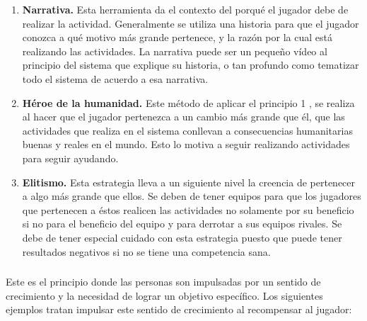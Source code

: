     \begin{enumerate}
    
        \item {\bf Narrativa.} Esta herramienta da el contexto del porqué el jugador debe de realizar la actividad. Generalmente se utiliza una historia para que el jugador conozca a qué motivo más grande pertenece, y la razón por la cual está realizando las actividades. La narrativa puede ser un pequeño vídeo al principio del sistema que explique su historia, o tan profundo como tematizar todo el sistema de acuerdo a esa narrativa.\cite[p. 81]{libro2}
        
        \item {\bf Héroe de la humanidad.} Este método de aplicar el principio 1 \principioI, se realiza al hacer que el jugador pertenezca a un cambio más grande que él, que las actividades que realiza en el sistema conllevan a consecuencias humanitarias buenas y reales en el mundo. Esto lo motiva a seguir realizando actividades para seguir ayudando.\cite[p. 82]{libro2}
        
        \item {\bf Elitismo.} Esta estrategia lleva a un siguiente nivel la creencia de pertenecer a algo más grande que ellos. Se deben de tener equipos para que los jugadores que pertenecen a éstos realicen las actividades no solamente por su beneficio si no para el beneficio del equipo y para derrotar a sus equipos rivales. Se debe de tener especial cuidado con esta estrategia puesto que puede tener resultados negativos si no se tiene una competencia sana.\cite[p. 83]{libro2}
    
    \end{enumerate}
    
    \subsubsection{\principioII}
    \label{subsec:principioII}
    
    Este es el principio donde las personas son impulsadas por un sentido de crecimiento y la necesidad de lograr un objetivo específico.\cite[p. 91]{libro2} Los siguientes ejemplos tratan impulsar este sentido de crecimiento al recompensar al jugador:
    
